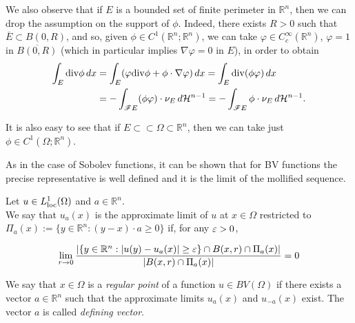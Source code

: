 \begin{remark} \label{G-G fin per bounded} We also observe that if $E$ is a bounded set of finite perimeter in $\mathbb{R}^{n}$, then we can drop the assumption on the support of $\phi$. Indeed, there exists $R > 0$ such that $\overline{E} \subset B(0, R)$, and so, given $\phi \in C^{1}(\mathbb{R}^{n}; \mathbb{R}^{n})$, we can take $\varphi \in C^{\infty}_{c}(\mathbb{R}^{n})$, $\varphi = 1$ in $\overline{B(0, R)}$ (which in particular implies $\nabla \varphi = 0$ in $E$), in order to obtain
\begin{align*} \int_{E} \mathrm{div} \phi \, dx & = \int_{E} (\varphi \mathrm{div}\phi + \phi \cdot \nabla \varphi) \, dx = \int_{E} \mathrm{div}(\phi \varphi) \, dx \\
& = - \int_{\mathscr{F} E} (\phi \varphi) \cdot \nu_{E}\, d\mathcal{H}^{n-1} = - \int_{\mathscr{F} E} \phi \cdot \nu_{E}\, d\mathcal{H}^{n-1}. 
\end{align*}

It is also easy to see that if $E \subset \subset \Omega \subset \mathbb{R}^{n}$, then we can take just $\phi \in C^{1}(\Omega; \mathbb{R}^{n})$.
\end{remark}

As in the case of Sobolev functions, it can be shown that for BV functions the precise representative is well defined and it is the limit of the mollified sequence.

\begin{definition} \label{approxlimrestr} Let $u \in L^{1}_{\rm loc}(\Omega)$ and $a \in \mathbb{R}^{n}$. 
\\
We say that $u_{a}(x)$ is the approximate limit of $u$ at $x \in \Omega$ restricted to $\Pi_{a}(x) := \{y \in \mathbb{R}^{n} : (y - x) \cdot a \ge 0 \}$ if, for any $\varepsilon > 0$,

\[\lim_{r \to 0} \frac{|\{y \in \mathbb{R}^{n} : |u(y) - u_{a}(x)| \ge \varepsilon \} \cap B(x,r) \cap \Pi_{a}(x)|}{|B(x,r) \cap \Pi_{a}(x)|} = 0 \]
\end{definition}
\begin{definition} We say that $x \in \Omega$ is a {\em regular point} of a function $u \in BV(\Omega)$ if there exists a vector $a \in \mathbb{R}^{n}$ such that the approximate limits $u_{a}(x)$ and $u_{-a}(x)$ exist. The vector $a$ is called {\em defining vector}.
\end{definition}

